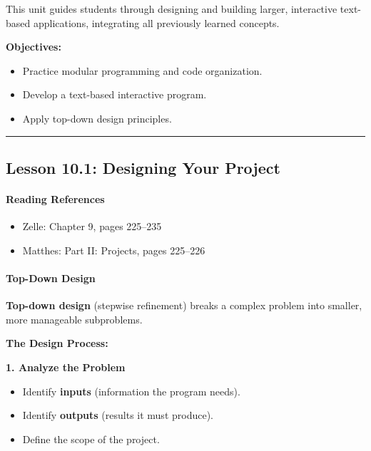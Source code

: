\documentclass[
  justified,
  openright,
]{tufte-book}
\let\subsubsection\paragraph
\let\paragraph\paragraph
\let\subsubsection\paragraph
\let\paragraph\paragraph
\providecommand{\tightlist}{%
  \setlength{\itemsep}{0pt}\setlength{\parskip}{0pt}}
\begin{document}
This unit guides students through designing and building larger,
interactive text-based applications, integrating all previously learned
concepts.

\textbf{Objectives:}

\begin{itemize}
\tightlist
\item
  Practice modular programming and code organization.
\item
  Develop a text-based interactive program.
\item
  Apply top-down design principles.
\end{itemize}

\begin{center}\rule{0.5\linewidth}{0.5pt}\end{center}

\subsection{Lesson 10.1: Designing Your
Project}\label{lesson-10.1-designing-your-project}

\subsubsection{Reading References}\label{reading-references-28}

\begin{itemize}
\tightlist
\item
  Zelle: Chapter 9, pages 225--235
\item
  Matthes: Part II: Projects, pages 225--226
\end{itemize}

\subsubsection{Top-Down Design}\label{top-down-design}

\textbf{Top-down design} (stepwise refinement) breaks a complex problem
into smaller, more manageable subproblems.

\textbf{The Design Process:}

\textbf{1. Analyze the Problem}

\begin{itemize}
\tightlist
\item
  Identify \textbf{inputs} (information the program needs).
\item
  Identify \textbf{outputs} (results it must produce).
\item
  Define the scope of the project.
\end{itemize}
\end{document}

